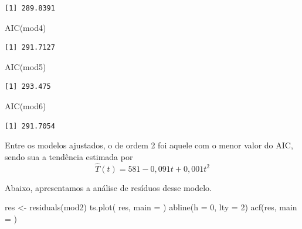 \documentclass[
  letterpaper,
  DIV=11,
  numbers=noendperiod]{scrartcl}
\newenvironment{Shaded}{\begin{snugshade}}{\end{snugshade}}
\newcommand{\AttributeTok}[1]{\textcolor[rgb]{0.40,0.45,0.13}{#1}}
\newcommand{\DecValTok}[1]{\textcolor[rgb]{0.68,0.00,0.00}{#1}}
\newcommand{\FunctionTok}[1]{\textcolor[rgb]{0.28,0.35,0.67}{#1}}
\newcommand{\NormalTok}[1]{\textcolor[rgb]{0.00,0.23,0.31}{#1}}
\newcommand{\OtherTok}[1]{\textcolor[rgb]{0.00,0.23,0.31}{#1}}
\newcommand{\StringTok}[1]{\textcolor[rgb]{0.13,0.47,0.30}{#1}}
\theoremstyle{definition}
\theoremstyle{definition}
\theoremstyle{plain}
\theoremstyle{plain}
\theoremstyle{remark}
\begin{document}
\begin{verbatim}
[1] 289.8391
\end{verbatim}

\begin{Shaded}
\begin{Highlighting}[]
\FunctionTok{AIC}\NormalTok{(mod4)}
\end{Highlighting}
\end{Shaded}

\begin{verbatim}
[1] 291.7127
\end{verbatim}

\begin{Shaded}
\begin{Highlighting}[]
\FunctionTok{AIC}\NormalTok{(mod5)}
\end{Highlighting}
\end{Shaded}

\begin{verbatim}
[1] 293.475
\end{verbatim}

\begin{Shaded}
\begin{Highlighting}[]
\FunctionTok{AIC}\NormalTok{(mod6)}
\end{Highlighting}
\end{Shaded}

\begin{verbatim}
[1] 291.7054
\end{verbatim}

Entre os modelos ajustados, o de ordem 2 foi aquele com o menor valor do
AIC, sendo sua a tendência estimada por
\[\hat{T}(t) = 581 -0,091 t + 0,001 t^2\]

Abaixo, apresentamos a análise de resíduos desse modelo.

\begin{Shaded}
\begin{Highlighting}[]
\NormalTok{res }\OtherTok{\textless{}{-}} \FunctionTok{residuals}\NormalTok{(mod2)}
\FunctionTok{ts.plot}\NormalTok{( res, }\AttributeTok{main =} \StringTok{\textquotesingle{}\textquotesingle{}}\NormalTok{)}
\FunctionTok{abline}\NormalTok{(}\AttributeTok{h =} \DecValTok{0}\NormalTok{, }\AttributeTok{lty =} \DecValTok{2}\NormalTok{)}
\FunctionTok{acf}\NormalTok{(res, }\AttributeTok{main =} \StringTok{\textquotesingle{}\textquotesingle{}}\NormalTok{)}
\end{Highlighting}
\end{Shaded}
\end{document}
